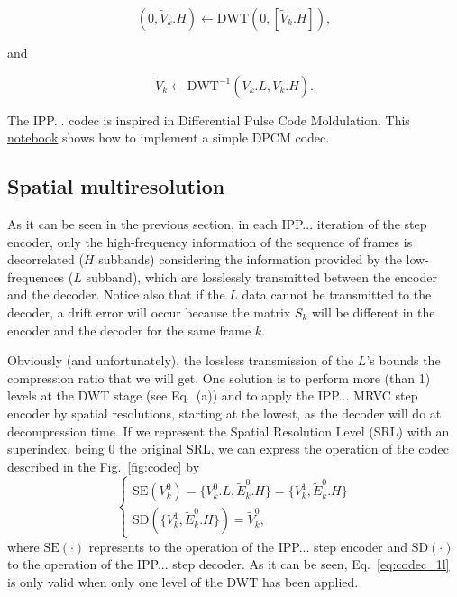 \begin{equation}
  (0, \tilde{V}_k.H) \leftarrow \text{DWT}(0, [\tilde{V}_k.H]),
  \tag{j}
\end{equation}

and

\begin{equation}
  \tilde{V}_k \leftarrow \text{DWT}^{-1}(V_k.L, \tilde{V}_k.H).
  \tag{k}
\end{equation}

The IPP... codec is inspired in Differential Pulse Code Moldulation.
This
\href{https://github.com/Sistemas-Multimedia/Sistemas-Multimedia.github.io/blob/master/milestones/12-IPP_coding/DPCM.ipynb}{notebook}
shows how to implement a simple DPCM codec.

\subsection{Spatial multiresolution}
As it can be seen in the previous section, in each IPP... iteration of
the step encoder, only the high-frequency information of the sequence
of frames is decorrelated ($H$ subbands) considering the information
provided by the low-frequences ($L$ subband), which are losslessly
transmitted between the encoder and the decoder. Notice also that if
the $L$ data cannot be transmitted to the decoder, a drift error will
occur because the matrix $S_k$ will be different in the encoder and
the decoder for the same frame $k$.

Obviously (and unfortunately), the lossless transmission of the $L$'s
bounds the compression ratio that we will get. One solution is to
perform more (than 1) levels at the DWT stage (see Eq.~(a)) and to
apply the IPP... MRVC step encoder by spatial resolutions, starting at
the lowest, as the decoder will do at decompression time. If we
represent the Spatial Resolution Level (SRL) with an superindex, being
0 the original SRL, we can express the operation of the codec
described in the Fig.~\ref{fig:codec} by
\begin{equation}
  \left\{
    \begin{array}{l}
      \text{SE}(V^0_k) = \{V^0_k.L, \tilde{E}^0_k.H\} = \{V^1_k, \tilde{E}^0_k.H\} \\
      \text{SD}(\{V^1_k, \tilde{E}^0_k.H\}) = \tilde{V}^0_k,
    \end{array}
  \right.
  \label{eq:codec_1l}
\end{equation}
where $\text{SE}(\cdot)$ represents to the operation of the
IPP... step encoder and $\text{SD}(\cdot)$ to the operation of the
IPP... step decoder. As it can be seen, Eq.~\ref{eq:codec_1l} is only
valid when only one level of the DWT has been applied.

